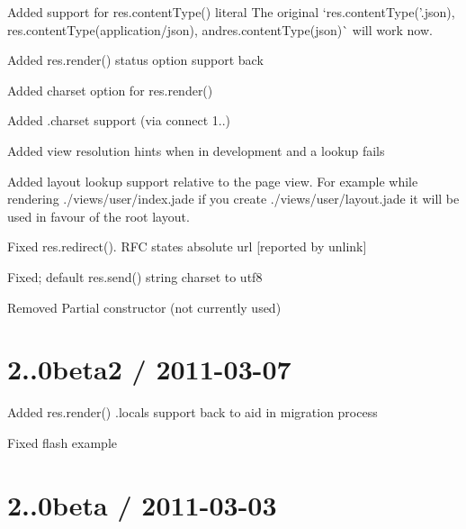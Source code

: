 {\ttfamily 
\begin{DoxyItemize}
\item Added support for {\ttfamily res.\+content\+Type()} literal The original `res.\+content\+Type('.json\textquotesingle{}){\ttfamily , }res.\+content\+Type(\textquotesingle{}application/json\textquotesingle{}){\ttfamily , and}res.\+content\+Type(\textquotesingle{}json\textquotesingle{})\`{} will work now.
\item Added {\ttfamily res.\+render()} status option support back
\item Added charset option for {\ttfamily res.\+render()}
\item Added {\ttfamily .charset} support (via connect 1..)
\item Added view resolution hints when in development and a lookup fails
\item Added layout lookup support relative to the page view. For example while rendering {\ttfamily ./views/user/index.jade} if you create {\ttfamily ./views/user/layout.jade} it will be used in favour of the root layout.
\item Fixed {\ttfamily res.\+redirect()}. R\+FC states absolute url \mbox{[}reported by unlink\mbox{]}
\item Fixed; default {\ttfamily res.\+send()} string charset to utf8
\item Removed {\ttfamily Partial} constructor (not currently used)
\end{DoxyItemize}}

{\ttfamily \section*{2..\+0beta2 / 2011-\/03-\/07 }}

{\ttfamily }

{\ttfamily 
\begin{DoxyItemize}
\item Added res.\+render() {\ttfamily .locals} support back to aid in migration process
\item Fixed flash example
\end{DoxyItemize}}

{\ttfamily \section*{2..\+0beta / 2011-\/03-\/03 }}

{\ttfamily }


